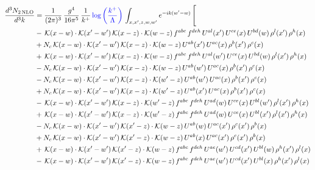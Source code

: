 \documentclass[9pt]{article}
\numberwithin{equation}{section}
\begin{document}
\begin{align}
\frac{d^{3}N_{2\,\mathrm{NLO}}}{d^{3}k} & = \frac{1}{(2\pi)^{3}}\,\frac{g^{4}}{16\pi^{5}}\,\frac{1}{k^{+}}\,{\color{blue}\log{\left(\frac{k^{+}}{\Lambda}\right)}}\,\int_{x,x',z,w,w'}e^{-ik(w'-w)}\,\Bigg[\notag\\ & -\,\mathcal{K}(x-w)\cdot\mathcal{K}(x'-w')\,\mathcal{K}(x-z)\cdot\mathcal{K}(w-z)\,f^{abc}\,f^{deh}\,U^{al}(x')\,U^{ce}(x)\,U^{bd}(w)\,\rho^{l}(x')\,\rho^{h}(x)\notag\\
& +N_{c}\,\mathcal{K}(x-w)\cdot\mathcal{K}(x'-w')\,\mathcal{K}(x-z)\cdot\mathcal{K}(w-z)\,U^{ab}(x')\,U^{ac}(x)\,\rho^{b}(x')\,\rho^{c}(x)\notag\\
& +\,\mathcal{K}(x-w)\cdot\mathcal{K}(x'-w')\,\mathcal{K}(x-z)\cdot\mathcal{K}(w-z)\,f^{abc}\,f^{deh}\,U^{al}(w')\,U^{ce}(x)\,U^{bd}(w)\,\rho^{l}(x')\,\rho^{h}(x)\notag\\
& -N_{c}\,\mathcal{K}(x-w)\cdot\mathcal{K}(x'-w')\,\mathcal{K}(x-z)\cdot\mathcal{K}(w-z)\,U^{ab}(w')\,U^{ac}(x)\,\rho^{b}(x')\,\rho^{c}(x)\notag\\
& -N_{c}\,\mathcal{K}(x-w)\cdot\mathcal{K}(x'-w')\,\mathcal{K}(x-z)\cdot\mathcal{K}(w'-z)\,U^{ab}(w')\,U^{ac}(x)\,\rho^{b}(x')\,\rho^{c}(x)\notag\\
& +N_{c}\,\mathcal{K}(x-w)\cdot\mathcal{K}(x'-w')\,\mathcal{K}(x-z)\cdot\mathcal{K}(w'-z)\,U^{ab}(x')\,U^{ac}(x)\,\rho^{b}(x')\,\rho^{c}(x)\notag\\
& -\,\mathcal{K}(x-w)\cdot\mathcal{K}(x'-w')\,\mathcal{K}(x-z)\cdot\mathcal{K}(w'-z)\,f^{abc}\,f^{deh}\,U^{ad}(w)\,U^{ce}(x)\,U^{bl}(w')\,\rho^{l}(x')\,\rho^{h}(x)\notag\\
& +\,\mathcal{K}(x-w)\cdot\mathcal{K}(x'-w')\,\mathcal{K}(x-z)\cdot\mathcal{K}(w'-z)\,f^{abc}\,f^{deh}\,U^{ad}(w)\,U^{ce}(x)\,U^{bl}(x')\,\rho^{l}(x')\,\rho^{h}(x)\notag\\
& -N_{c}\,\mathcal{K}(x-w)\cdot\mathcal{K}(x'-w')\,\mathcal{K}(x'-z)\cdot\mathcal{K}(w-z)\,U^{ab}(w)\,U^{ac}(x')\,\rho^{c}(x')\,\rho^{b}(x)\notag\\
& +N_{c}\,\mathcal{K}(x-w)\cdot\mathcal{K}(x'-w')\,\mathcal{K}(x'-z)\cdot\mathcal{K}(w-z)\,U^{ab}(x)\,U^{ac}(x')\,\rho^{c}(x')\,\rho^{b}(x)\notag\\
& +\,\mathcal{K}(x-w)\cdot\mathcal{K}(x'-w')\,\mathcal{K}(x'-z)\cdot\mathcal{K}(w-z)\,f^{abc}\,f^{deh}\,U^{ae}(w')\,U^{cd}(x')\,U^{bl}(w)\,\rho^{h}(x')\,\rho^{l}(x)\notag\\
& -\,\mathcal{K}(x-w)\cdot\mathcal{K}(x'-w')\,\mathcal{K}(x'-z)\cdot\mathcal{K}(w-z)\,f^{abc}\,f^{deh}\,U^{ae}(w')\,U^{cd}(x')\,U^{bl}(x)\,\rho^{h}(x')\,\rho^{l}(x)\notag\\

\end{align}
\end{document}
